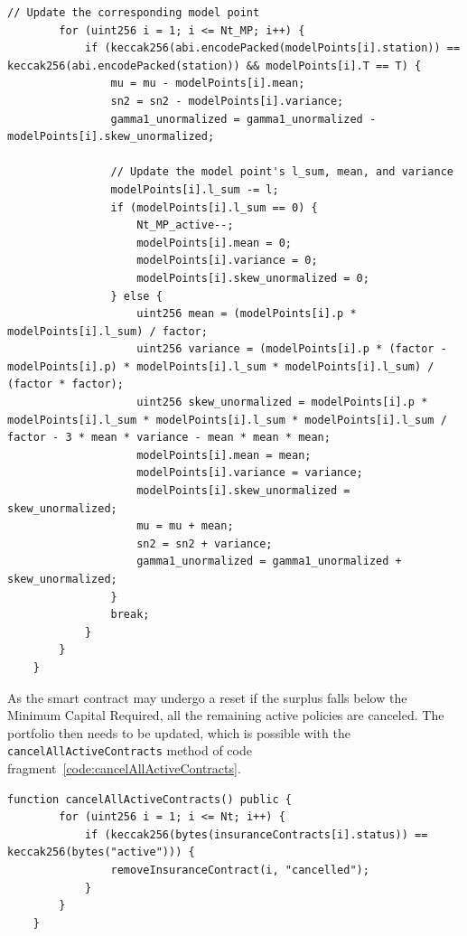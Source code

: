 \documentclass[10pt]{article}
\begin{document}
\begin{codefragment}[!h]
\begin{lstlisting}[language=Solidity]
        // Update the corresponding model point
        for (uint256 i = 1; i <= Nt_MP; i++) {
            if (keccak256(abi.encodePacked(modelPoints[i].station)) == keccak256(abi.encodePacked(station)) && modelPoints[i].T == T) {
                mu = mu - modelPoints[i].mean;
                sn2 = sn2 - modelPoints[i].variance;
                gamma1_unormalized = gamma1_unormalized - modelPoints[i].skew_unormalized;

                // Update the model point's l_sum, mean, and variance
                modelPoints[i].l_sum -= l;
                if (modelPoints[i].l_sum == 0) {
                    Nt_MP_active--;
                    modelPoints[i].mean = 0;
                    modelPoints[i].variance = 0;
                    modelPoints[i].skew_unormalized = 0;
                } else {
                    uint256 mean = (modelPoints[i].p * modelPoints[i].l_sum) / factor;
                    uint256 variance = (modelPoints[i].p * (factor - modelPoints[i].p) * modelPoints[i].l_sum * modelPoints[i].l_sum) / (factor * factor);
                    uint256 skew_unormalized = modelPoints[i].p * modelPoints[i].l_sum * modelPoints[i].l_sum * modelPoints[i].l_sum / factor - 3 * mean * variance - mean * mean * mean;
                    modelPoints[i].mean = mean;
                    modelPoints[i].variance = variance;
                    modelPoints[i].skew_unormalized = skew_unormalized;
                    mu = mu + mean;
                    sn2 = sn2 + variance;
                    gamma1_unormalized = gamma1_unormalized + skew_unormalized;
                }
                break;
            }
        }
    }
        \end{lstlisting}
    \caption{Part 2 of \texttt{removeInsuranceContract} method.}
    \label{code:removeInsuranceContract_2}
\end{codefragment}

\newpage

As the smart contract may undergo a reset if the surplus falls below the Minimum Capital Required, all the remaining active policies are canceled. The portfolio then needs to be updated, which is possible with the \texttt{cancelAllActiveContracts} method of code fragment~\ref{code:cancelAllActiveContracts}.


\begin{codefragment}[!h]
\begin{lstlisting}[language=Solidity]
function cancelAllActiveContracts() public {
        for (uint256 i = 1; i <= Nt; i++) {
            if (keccak256(bytes(insuranceContracts[i].status)) == keccak256(bytes("active"))) {
                removeInsuranceContract(i, "cancelled");
            }
        }
    }
        \end{lstlisting}
    \caption{\texttt{cancelAllActiveContracts} method.}
    \label{code:cancelAllActiveContracts}
\end{codefragment}
\end{document}
